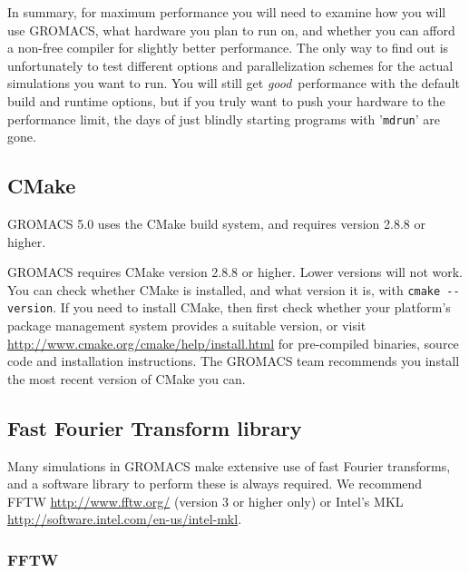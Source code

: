 \documentclass{article}[12pt,a4paper,twoside]
\newcommand{\gromacs}{GROMACS}
\newcommand{\fftw}{FFTW}
\newcommand{\mkl}{MKL}
\newcommand{\cmake}{CMake}
\newcommand{\cmakeversion}{2.8.8}
\newcommand{\gromacsversion}{5.0}
\begin{document}
In summary, for maximum performance you will need to 
examine how you will use \gromacs{}, what hardware you plan to run
on, and whether you can afford a non-free compiler for slightly better
performance. The only way to find out is unfortunately to test different
options and parallelization schemes for the actual simulations you
want to run. You will still get {\em good}\, performance with the default
build and runtime options, but if you truly want to push your hardware
to the performance limit, the days of just blindly starting programs
with '\verb+mdrun+' are gone.

\subsection{CMake}

\gromacs{} \gromacsversion{} uses the \cmake{} build system, and
requires version \cmakeversion{} or higher.

\gromacs{} requires \cmake{} version \cmakeversion{} or higher. Lower
versions will not work. You can check whether \cmake{} is installed,
and what version it is, with \verb+cmake --version+. If you need to
install \cmake{}, then first check whether your platform's package
management system provides a suitable version, or visit
\url{http://www.cmake.org/cmake/help/install.html} for pre-compiled
binaries, source code and installation instructions. The \gromacs{}
team recommends you install the most recent version of \cmake{} you
can.

\subsection{Fast Fourier Transform library}

Many simulations in \gromacs{} make extensive use of fast Fourier transforms,
and a software library to perform these is always required. We
recommend \fftw{} \url{http://www.fftw.org/} (version 3 or higher
only) or Intel's \mkl{} \url{http://software.intel.com/en-us/intel-mkl}. 

\subsubsection{\fftw{}}
\end{document}
